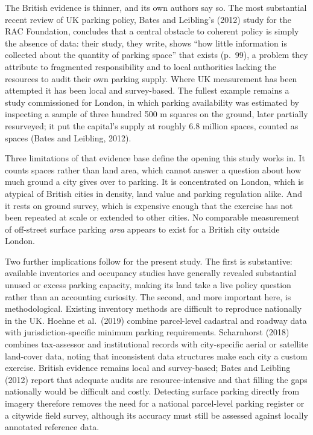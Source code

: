 The British evidence is thinner, and its own authors say so. The most substantial recent review of UK parking policy, Bates and Leibling's (2012) study for the RAC Foundation, concludes that a central obstacle to coherent policy is simply the absence of data: their study, they write, shows ``how little information is collected about the quantity of parking space'' that exists (p.~99), a problem they attribute to fragmented responsibility and to local authorities lacking the resources to audit their own parking supply. Where UK measurement has been attempted it has been local and survey-based. The fullest example remains a study commissioned for London, in which parking availability was estimated by inspecting a sample of three hundred 500 m squares on the ground, later partially resurveyed; it put the capital's supply at roughly 6.8 million spaces, counted as spaces (Bates and Leibling, 2012).

Three limitations of that evidence base define the opening this study works in. It counts spaces rather than land area, which cannot answer a question about how much ground a city gives over to parking. It is concentrated on London, which is atypical of British cities in density, land value and parking regulation alike. And it rests on ground survey, which is expensive enough that the exercise has not been repeated at scale or extended to other cities. No comparable measurement of off-street surface parking \emph{area} appears to exist for a British city outside London.

Two further implications follow for the present study. The first is substantive: available inventories and occupancy studies have generally revealed substantial unused or excess parking capacity, making its land take a live policy question rather than an accounting curiosity. The second, and more important here, is methodological. Existing inventory methods are difficult to reproduce nationally in the UK. Hoehne et al.~(2019) combine parcel-level cadastral and roadway data with jurisdiction-specific minimum parking requirements. Scharnhorst (2018) combines tax-assessor and institutional records with city-specific aerial or satellite land-cover data, noting that inconsistent data structures make each city a custom exercise. British evidence remains local and survey-based; Bates and Leibling (2012) report that adequate audits are resource-intensive and that filling the gaps nationally would be difficult and costly. Detecting surface parking directly from imagery therefore removes the
need for a national parcel-level parking register or a citywide field survey, although its accuracy must still be assessed against locally annotated reference data.

